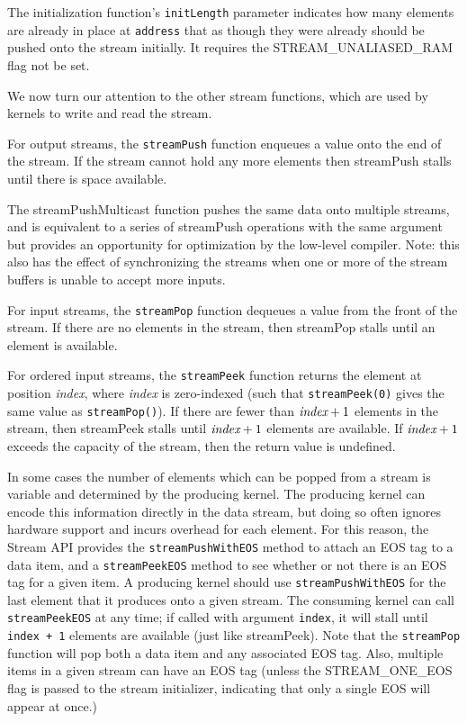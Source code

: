 The initialization function's {\tt initLength} parameter indicates how
many elements are already in place at {\tt address} that as though
they were already should be pushed onto the stream initially. It
requires the STREAM\_UNALIASED\_RAM flag not be set.


We now turn our attention to the other stream functions, which are
used by kernels to write and read the stream.

 For output streams, the {\tt streamPush} function
enqueues a value onto the end of the stream.  If the stream cannot
hold any more elements then streamPush stalls until there is space
available.

 The streamPushMulticast function pushes the
same data onto multiple streams, and is equivalent to a series of
streamPush operations with the same argument but provides an
opportunity for optimization by the low-level compiler.  Note: this
also has the effect of synchronizing the streams when one or more of
the stream buffers is unable to accept more inputs.

 For input streams, the {\tt streamPop} function
dequeues a value from the front of the stream.  If there are no
elements in the stream, then streamPop stalls until an element is
available.

 For ordered input streams, the {\tt streamPeek}
function returns the element at position {\it index}, where {\it
index} is zero-indexed (such that {\tt streamPeek(0)} gives the same
value as {\tt streamPop()}).  If there are fewer than $\mbox{\it index}+1$
elements in the stream, then streamPeek stalls until $\mbox{\it index}+1$
elements are available. If $\mbox{\it index}+1$ exceeds the capacity of the
stream, then the return value is undefined.

 In some cases the number of elements which can be
popped from a stream is variable and determined by the producing
kernel.  The producing kernel can encode this information directly in
the data stream, but doing so often ignores hardware support and
incurs overhead for each element.  For this reason, the Stream API
provides the {\tt streamPushWithEOS} method to attach an EOS tag to a
data item, and a {\tt streamPeekEOS} method to see whether or not
there is an EOS tag for a given item.  A producing kernel should use
{\tt streamPushWithEOS} for the last element that it produces onto a
given stream.  The consuming kernel can call {\tt streamPeekEOS} at
any time; if called with argument {\tt index}, it will stall until
{\tt index + 1} elements are available (just like streamPeek).  Note
that the {\tt streamPop} function will pop both a data item and any
associated EOS tag.  Also, multiple items in a given stream can have
an EOS tag (unless the STREAM\_ONE\_EOS flag is passed to the stream
initializer, indicating that only a single EOS will appear at once.)

